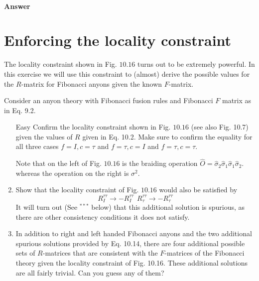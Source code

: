 \documentclass{book}
\begin{document}
\paragraph{Answer}


\section{Enforcing the locality constraint}
The locality constraint shown in Fig. $10.16$ turns out to be extremely powerful. In this exercise we will use this constraint to (almost) derive the possible values for the $R$-matrix for Fibonacci anyons given the known $F$-matrix.

Consider an anyon theory with Fibonacci fusion rules and Fibonacci $F$ matrix as in Eq. 9.2.
\begin{enumerate}
\item [Easy] Confirm the locality constraint shown in Fig. $10.16$ (see also Fig. 10.7) given the values of $R$ given in Eq. 10.2. Make sure to confirm the equality for all three cases $f=I,c=\tau $ and $f=\tau ,c=I$ and $f=\tau ,c=\tau $. 

Note that on the left of Fig. $10.16$ is the braiding operation $\hat{O} =\hat{\sigma }_{2}\hat{\sigma }_{1}\hat{\sigma }_{1}\hat{\sigma }_{2}$. whereas the operation on the right is $\sigma ^{2}$.
\item Show that the locality constraint of Fig. $10.16$ would also be satisfied by\begin{equation*}
R_{I}^{\tau \tau }\rightarrow -R_{I}^{\tau \tau } \ \ R_{\tau }^{\tau \tau }\rightarrow -R_{\tau }^{\tau \tau }
\end{equation*}It will turn out (See $^{***}$ below) that this additional solution is spurious, as there are other consistency conditions it does not satisfy.
\item In addition to right and left handed Fibonacci anyons and the two additional spurious solutions provided by Eq. 10.14, there are four additional possible sets of $R$-matrices that are consistent with the $F$-matrices of the Fibonacci theory given the locality constraint of Fig. 10.16. These additional solutions are all fairly trivial. Can you guess any of them?


\end{enumerate}
\end{document}
